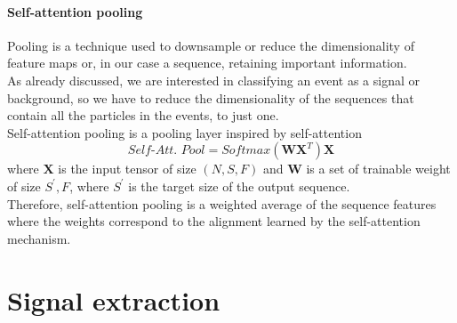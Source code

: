\paragraph*{Self-attention pooling}


Pooling is a technique used to downsample or reduce the dimensionality of feature maps or, in our case a sequence, retaining important information.\\
As already discussed, we are interested in classifying an event as a signal or background, so we have to reduce the dimensionality of the sequences that contain all the particles in the events, to just one.\\
Self-attention pooling \cite{Safari2020Self-attentionRecognition} is a pooling layer inspired by self-attention
\begin{equation}
    \textit{Self-Att. Pool}=\textit{Softmax}(\bm{W} \bm{X}^T)\bm{X}
\end{equation}
where $\bm{X}$ is the input tensor of size $(N,S,F)$ and $\bm{W}$ is a set of trainable weight of size $S^{'},F$, where $S^{'}$ is the target size of the output sequence.\\
Therefore, self-attention pooling is a weighted average of the sequence features where the weights correspond to the alignment learned by the self-attention mechanism.













\newpage
\section{Signal extraction}
